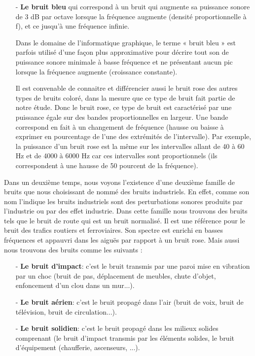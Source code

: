 \documentclass[conference,onecolumn]{IEEEtran}
\begin{document}
\begin{itemize}
    \item[-] \textbf{Le bruit bleu} qui correspond à un bruit qui augmente sa puissance sonore de 3 dB par octave lorsque la fréquence augmente (densité proportionnelle à f), et ce jusqu’à une fréquence infinie. 

    Dans le domaine de l’informatique graphique, le terme « bruit bleu » est parfois utilisé d’une façon plus approximative pour décrire tout son de puissance sonore minimale à basse fréquence et ne présentant aucun pic lorsque la fréquence augmente (croissance constante). 

    Il est convenable de connaitre et différencier aussi le bruit rose des autres types de bruits coloré, dans la mesure que ce type de bruit fait partie de notre étude. Donc le bruit rose, ce type de bruit est caractérisé par une puissance égale sur des bandes proportionnelles en largeur. Une bande correspond en fait à un changement de fréquence (hausse ou baisse à exprimer en pourcentage de l’une des extrémités de l’intervalle). Par exemple, la puissance d’un bruit rose est la même sur les intervalles allant de 40 à 60 Hz et de 4000 à 6000 Hz car ces intervalles sont proportionnels (ils correspondent à une hausse de 50 pourcent de la fréquence). 

\end{itemize}
\hfill

Dans un deuxième temps, nous voyons l’existence d’une deuxième
famille de bruits que nous choisissant de nommé des bruits
industriels. En effet, comme son nom l’indique les bruits
industriels sont des perturbations sonores produits par l’industrie
ou par des effet industrie. Dans cette famille nous trouvons des
bruits tels que le bruit de route qui est un bruit normalisé. Il est
une référence pour le bruit des trafics routiers et ferroviaires.
Son spectre est enrichi en basses fréquences et appauvri dans les
aiguës par rapport à un bruit rose. Mais aussi nous trouvons des
bruits comme les suivants :
\hfill

\begin{itemize}

    \item[-] \textbf{Le bruit d’impact}: c’est le bruit transmis par une paroi mise en vibration par un choc (bruit de pas, déplacement de meubles, chute d’objet, enfoncement d’un clou dans un mur...).
    \item[-] \textbf{Le bruit aérien}: c’est le bruit propagé dans l’air (bruit de voix, bruit de télévision, bruit de circulation...). 
    \item[-] \textbf{Le bruit solidien}: c’est le bruit propagé dans les milieux solides comprenant (le bruit d’impact transmis par les éléments solides, le bruit d’équipement (chaufferie, ascenseurs, ...). 
    
\end{itemize}
\end{document}
